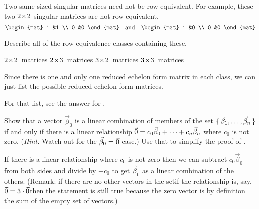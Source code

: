 \begin{exercises}
\begin{answer}
      Two same-sized singular matrices need not be row equivalent.
      For example, these two \( 2 \! \times \! 2 \) singular matrices
      are not row equivalent.
      \begin{equation*}
        \begin{mat}
          1  &1  \\
          0  &0
        \end{mat}
        \quad\text{and}\quad
        \begin{mat}
          1  &0  \\
          0  &0
        \end{mat}
      \end{equation*}  
    \end{answer}
  \recommended \item 
    Describe all of the row equivalence classes containing these.
    \begin{exparts*}
      \partsitem \( 2 \! \times \! 2 \)~matrices
      \partsitem \( 2 \! \times \! 3 \)~matrices
      \partsitem \( 3 \! \times \! 2 \)~matrices
      \partsitem \( 3 \! \times \! 3 \)~matrices
    \end{exparts*}
    \begin{answer}
      Since there is one and only one reduced echelon form matrix in each
      class, we can just list the possible reduced echelon form matrices.

      For that list, see the answer for . 
    \end{answer}
  \item  
     \begin{exparts}
          \partsitem Show that a vector $\vec{\beta}_0$ is a linear combination
            of members of the set $\mbox{$\{\,\vec{\beta}_1,\ldots,\vec{\beta}_n\,\}$}$
            if and only if there is a linear relationship 
            $\vec{0}=c_0\vec{\beta}_0+\cdots+c_n\vec{\beta}_n$
            where $c_0$ is not zero.
            (\textit{Hint.}   Watch out for the $\vec{\beta}_0=\vec{0}$ case.)
         \partsitem Use that to simplify the proof of 
            .   
       \end{exparts}
       \begin{answer}
          \begin{exparts}
           \partsitem If there is a linear relationship where $c_0$ is not zero
             then we can subtract $c_0\vec{\beta}_0$ from both sides and divide
             by $-c_0$ to get $\vec{\beta}_0$ as a linear
             combination of the others.
             (Remark:  
             if there are no other vectors in the set\Dash if the 
             relationship is, say, 
             $\vec{0}=3\cdot\vec{0}$\Dash then the statement is still true because
             the zero vector is by definition the sum of the empty set 
             of vectors.)


\end{exparts}
\end{answer}
\end{exercises}
